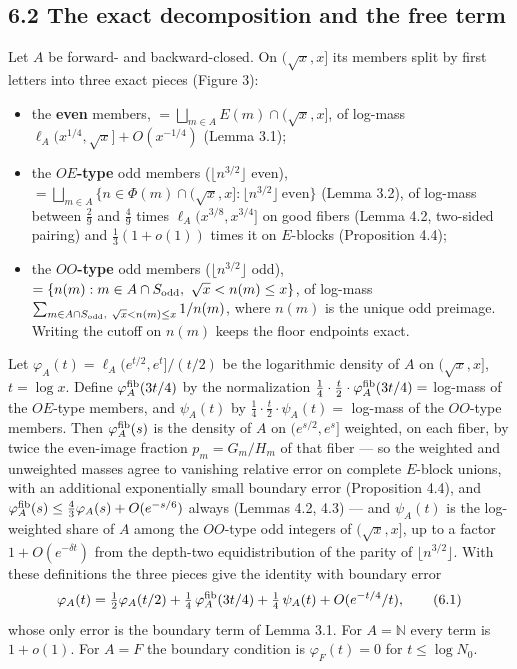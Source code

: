 \documentclass[11pt,a4paper]{article}
\providecommand{\tightlist}{\setlength{\itemsep}{0pt}\setlength{\parskip}{0pt}}
\begin{document}
\subsection{6.2 The exact decomposition and the free
term}\label{the-exact-decomposition-and-the-free-term}

Let \(A\) be forward- and backward-closed. On \((\sqrt x,x]\) its
members split by first letters into three exact pieces (Figure 3):

\begin{itemize}
\tightlist
\item
  the \textbf{even} members, \(=\bigsqcup_{m\in A}E(m)\cap(\sqrt x,x]\),
  of log-mass \(\ell_A(x^{1/4},\sqrt x]+O(x^{-1/4})\) (Lemma 3.1);
\item
  the \textbf{\(OE\)-type} odd members (\(\lfloor n^{3/2}\rfloor\)
  even),
  \(=\bigsqcup_{m\in A}\{n\in\Phi(m)\cap(\sqrt x,x]:\lfloor n^{3/2}\rfloor\ \text{even}\}\)
  (Lemma 3.2), of log-mass between \(\tfrac29\) and \(\tfrac49\) times
  \(\ell_A(x^{3/8},x^{3/4}]\) on good fibers (Lemma 4.2, two-sided
  pairing) and \(\tfrac13(1+o(1))\) times it on \(E\)-blocks
  (Proposition 4.4);
\item
  the \textbf{\(OO\)-type} odd members (\(\lfloor n^{3/2}\rfloor\) odd),
  \(=\{n(m):m\in A\cap S_{\rm odd},\ \sqrt x<n(m)\le x\}\), of log-mass
  \(\sum_{m\in A\cap S_{\rm odd},\ \sqrt x<n(m)\le x}1/n(m)\), where
  \(n(m)\) is the unique odd preimage. Writing the cutoff on \(n(m)\)
  keeps the floor endpoints exact.
\end{itemize}

Let \(\varphi_A(t)=\ell_A(e^{t/2},e^t]/(t/2)\) be the logarithmic
density of \(A\) on \((\sqrt x,x]\), \(t=\log x\). Define
\(\varphi^{\rm fib}_A(3t/4)\) by the normalization
\(\tfrac14\cdot\tfrac t2\cdot\varphi^{\rm fib}_A(3t/4)=\) log-mass of
the \(OE\)-type members, and \(\psi_A(t)\) by
\(\tfrac14\cdot\tfrac t2\cdot\psi_A(t)=\) log-mass of the \(OO\)-type
members. Then \(\varphi^{\rm fib}_A(s)\) is the density of \(A\) on
\((e^{s/2},e^s]\) weighted, on each fiber, by twice the even-image
fraction \(p_m=G_m/H_m\) of that fiber --- so the weighted and
unweighted masses agree to vanishing relative error on complete
\(E\)-block unions, with an additional exponentially small boundary
error (Proposition 4.4), and
\(\varphi^{\rm fib}_A(s)\le\tfrac43\varphi_A(s)+O(e^{-s/6})\) always
(Lemmas 4.2, 4.3) --- and \(\psi_A(t)\) is the log-weighted share of
\(A\) among the \(OO\)-type odd integers of \((\sqrt x,x]\), up to a
factor \(1+O(e^{-\delta t})\) from the depth-two equidistribution of the
parity of \(\lfloor n^{3/2}\rfloor\). With these definitions the three
pieces give the identity with boundary error \[
\varphi_A(t)=\tfrac12\varphi_A(t/2)+\tfrac14\,\varphi^{\rm fib}_A(3t/4)+\tfrac14\,\psi_A(t)+O(e^{-t/4}/t),
\tag{6.1}
\] whose only error is the boundary term of Lemma 3.1. For
\(A=\mathbb N\) every term is \(1+o(1)\). For \(A=F\) the boundary
condition is \(\varphi_F(t)=0\) for \(t\le\log N_0\).
\end{document}
